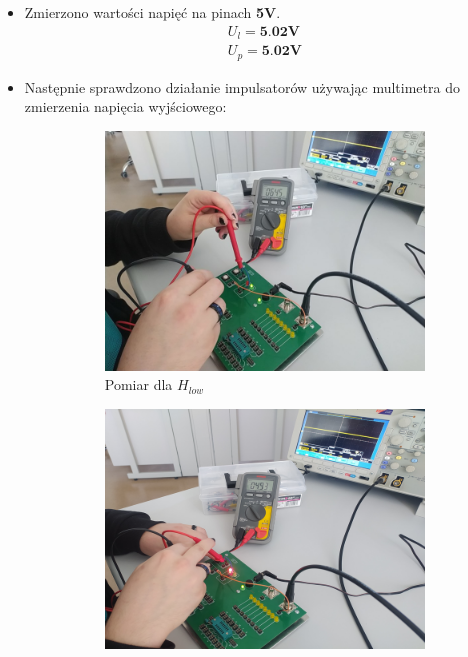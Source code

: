 \begin{itemize}
    \item Zmierzono wartości napięć na pinach \textbf{5V}.
        \begin{gather}
            \label{płytka:U_l} U_l = \textbf{5.02V} \\
            \label{płytka:U_p} U_p = \textbf{5.02V}
        \end{gather}
    \item Następnie sprawdzono działanie impulsatorów używając multimetra do zmierzenia napięcia wyjściowego:
        \begin{figure}[H]
            \centering
                \begin{subfigure}[h]{0.4\textwidth}
                    \includegraphics[width=\textwidth]{img/test_plytka/1652306733029_scaled.jpg}
                    \caption*{Pomiar dla $H_{low}$}
                \end{subfigure}
                \begin{subfigure}[h]{0.4\textwidth}
                    \includegraphics[width=\textwidth]{img/test_plytka/1652306733016_scaled.png}

\end{subfigure}
\end{figure}
\end{itemize}
